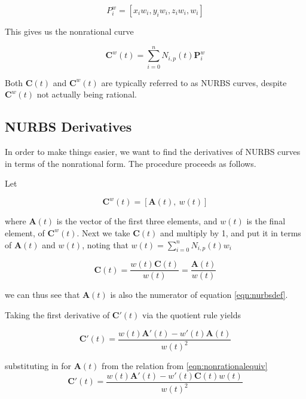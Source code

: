 \begin{equation}
	P^w_i = [x_iw_i,y_iw_i,z_iw_i,w_i]
\end{equation}

This gives us the nonrational curve

\begin{equation}
	\textbf{C}^w(t) = \sum^n_{i=0}N_{i,p}(t) \textbf{P}^w_i
\end{equation}

Both \(\textbf{C}(t)\) and \(\textbf{C}^w(t)\) are typically referred to as NURBS curves, despite \(\textbf{C}^w(t)\) not actually being rational.

\subsection{NURBS Derivatives}
In order to make things easier, we want to find the derivatives of NURBS curves in terms of the nonrational form. The procedure proceeds as follows.

Let 

\begin{equation}
	\textbf{C}^w(t) = [\textbf{A}(t),~w(t)]
\end{equation}

where \(\textbf{A}(t)\) is the vector of the first three elements, and \(w(t)\) is the final element, of \(\textbf{C}^w(t)\). Next we take \(\textbf{C}(t)\) and multiply by 1, and put it in terms of \(\textbf{A}(t)\) and \(w(t)\), noting that \(w(t)=\sum^n_{i=0}N_{i,p}(t) w_i \)

\begin{equation}
\label{eqn:nonrationalequiv}
	\textbf{C}(t) = \frac{ w(t) \textbf{C}(t) }{ w(t) } = \frac{ \textbf{A}(t) }{ w(t) }
\end{equation}

we can thus see that \(\textbf{A}(t)\) is also the numerator of equation \cref{eqn:nurbsdef}.

Taking the first derivative of $\textbf{C}'(t)$ via the quotient rule yields

\begin{equation}
	\textbf{C}'(t) = \frac{ w(t)\textbf{A}'(t) - w'(t) \textbf{A}(t) }{ w(t)^2 }
\end{equation}

substituting in for \(\textbf{A}(t)\) from the relation from \cref{eqn:nonrationalequiv}
\begin{equation} 
	\textbf{C}'(t) = \frac{  w(t)\textbf{A}'(t) - w'(t) \textbf{C}(t)w(t) }{ w(t)^2 }
\end{equation}

